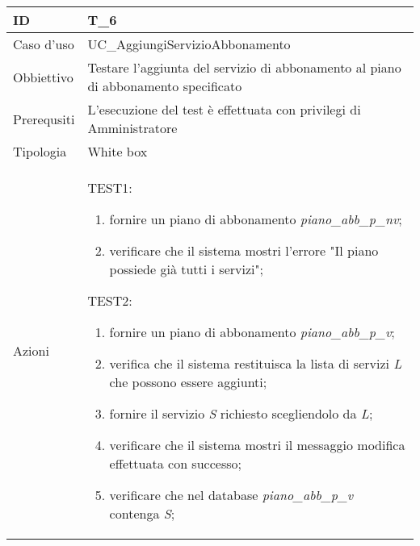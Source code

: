 \begin{table}[hb]
    \centering
    \begin{tabular}{ |p{2cm}|p{10cm}|  }
        \hline
        ID          & T\_6                                                                               \\\hline
        Caso d'uso  & UC\_AggiungiServizioAbbonamento                                                    \\\hline
        Obbiettivo  & Testare l'aggiunta del servizio di abbonamento al piano di abbonamento specificato \\\hline
        Prerequsiti & L'esecuzione del test è effettuata con privilegi di Amministratore                 \\\hline
        Tipologia   & White box                                                                          \\\hline
        Azioni      &
        TEST1:
        \begin{enumerate}[nosep, topsep=0pt]
            \item fornire un piano di abbonamento \emph{piano\_abb\_p\_nv};
            \item verificare che il sistema mostri l'errore "Il piano possiede già tutti i servizi";
        \end{enumerate}
        \vspace{0.5cm} TEST2:
        \begin{enumerate}[nosep, topsep=0pt]
            \item fornire un piano di abbonamento \emph{piano\_abb\_p\_v};
            \item verifica che il sistema restituisca la lista di servizi \emph{L} che possono essere aggiunti;
            \item fornire il servizio \emph{S} richiesto scegliendolo da \emph{L};
            \item verificare che il sistema mostri il messaggio modifica effettuata con successo;
            \item verificare che nel database \emph{piano\_abb\_p\_v} contenga \emph{S};
        \end{enumerate}
        \\\hline
    \end{tabular}
\end{table}

